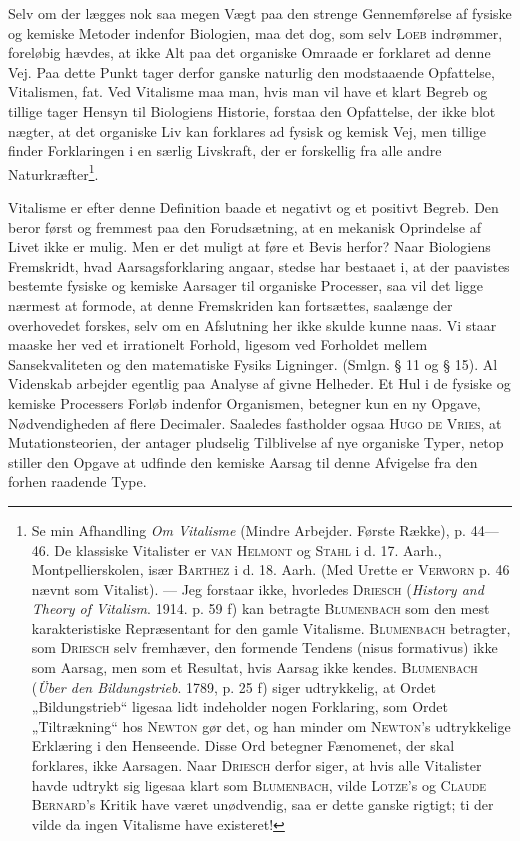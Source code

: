 \documentclass[12pt]{article}
\newcommand{\opage}[1]{\marginnote{\footnotesize\textit{[#1]}}}
\begin{document}
\setcounter{footnote}{0}%
\opage{53}Selv om der lægges nok saa megen Vægt paa den strenge Gennemførelse af
fysiske og kemiske Metoder indenfor Biologien, maa det dog, som selv \textsc{Loeb}
indrømmer, foreløbig hævdes, at ikke Alt paa det organiske Omraade er forklaret ad
denne Vej. Paa dette Punkt tager derfor ganske naturlig den modstaaende
Opfattelse, Vitalismen, fat. Ved Vitalisme maa man, hvis man vil have et klart
Begreb og tillige tager Hensyn til Biologiens Historie, forstaa den Opfattelse, der ikke
blot nægter, at det organiske Liv kan forklares ad fysisk og kemisk Vej, men tillige
finder Forklaringen i en særlig Livskraft, der er forskellig fra alle andre
Naturkræfter\footnote{Se min Afhandling \textit{Om Vitalisme} (Mindre Arbejder.
Første Række), p. 44---46. De klassiske Vitalister er \textsc{van Helmont} og
\textsc{Stahl} i d. 17. Aarh., Montpellierskolen, især \textsc{Barthez} i d. 18.
Aarh. (Med Urette er \textsc{Verworn} p. 46 nævnt som Vitalist). --- Jeg forstaar
ikke, hvorledes \textsc{Driesch} (\textit{History and Theory of Vitalism}. 1914.
p. 59 f) kan betragte \textsc{Blumenbach} som den mest karakteristiske
Repræsentant for den gamle Vitalisme. \textsc{Blumenbach} betragter, som
\textsc{Driesch} selv fremhæver, den formende Tendens (nisus formativus) ikke som
Aarsag, men som et Resultat, hvis Aarsag ikke kendes. \textsc{Blumenbach}
(\textit{Über den Bildungstrieb}. 1789, p. 25 f) siger udtrykkelig, at Ordet
„Bildungstrieb“ ligesaa lidt indeholder nogen Forklaring, som Ordet „Tiltrækning“
hos \textsc{Newton} gør det, og han minder om \textsc{Newton}'s udtrykkelige
Erklæring i den Henseende. Disse Ord betegner Fænomenet, der skal forklares, ikke
Aarsagen. Naar \textsc{Driesch} derfor siger, at hvis alle Vitalister havde
udtrykt sig ligesaa klart som \textsc{Blumenbach}, vilde \textsc{Lotze}'s og
\textsc{Claude Bernard}'s Kritik have været unødvendig, saa er dette ganske
rigtigt; ti der vilde da ingen Vitalisme have existeret!}.

Vitalisme er efter denne Definition baade et negativt og et positivt Begreb.
Den beror først og fremmest paa den Forudsætning, at en mekanisk Oprindelse af
Livet ikke er mulig. Men er det muligt at føre et Bevis herfor? Naar Biologiens
Fremskridt, hvad Aarsagsforklaring angaar, stedse har bestaaet i, at der paavistes
bestemte fysiske og kemiske Aarsager til organiske Processer, saa vil det ligge
nærmest at formode, at denne Fremskriden kan fortsættes, saalænge der overhovedet
forskes, selv om en Afslutning her ikke skulde kunne naas. Vi staar maaske her
ved et irrationelt Forhold, ligesom ved Forholdet mellem Sansekvaliteten og den
matematiske Fysiks Ligninger. (Smlgn. § 11 og § 15). Al Videnskab arbejder egentlig
paa Analyse af givne Helheder. Et Hul i de fysiske og kemiske Processers Forløb
indenfor Organismen, betegner kun en ny Opgave, Nødvendigheden af flere
Decimaler. Saaledes fastholder ogsaa \textsc{Hugo de Vries}, at Mutationsteorien, der antager
pludselig Tilblivelse af nye organiske Typer, netop stiller den Opgave at udfinde
den kemiske Aarsag til denne Afvigelse fra den forhen raadende Type.
\end{document}
